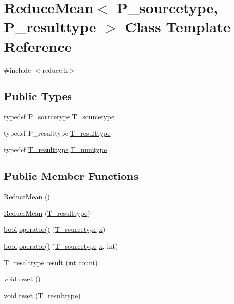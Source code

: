\hypertarget{classReduceMean}{}\section{Reduce\+Mean$<$ P\+\_\+sourcetype, P\+\_\+resulttype $>$ Class Template Reference}
\label{classReduceMean}


{\ttfamily \#include $<$reduce.\+h$>$}

\subsection*{Public Types}
\begin{DoxyCompactItemize}
\item 
typedef P\+\_\+sourcetype \hyperlink{classReduceMean_a5764ca6260fcf90c35a516b7a5ec0fde}{T\+\_\+sourcetype}
\item 
typedef P\+\_\+resulttype \hyperlink{classReduceMean_a6ba4ff1f0f7d4ddf9d2b2a1ed93d7812}{T\+\_\+resulttype}
\item 
typedef \hyperlink{classReduceMean_a6ba4ff1f0f7d4ddf9d2b2a1ed93d7812}{T\+\_\+resulttype} \hyperlink{classReduceMean_afe8ae2f9c567033aceb0824e8ee735e6}{T\+\_\+numtype}
\end{DoxyCompactItemize}
\subsection*{Public Member Functions}
\begin{DoxyCompactItemize}
\item 
\hyperlink{classReduceMean_a25faac9d0a8ae09621d6bac6831dfa5d}{Reduce\+Mean} ()
\item 
\hyperlink{classReduceMean_ab999b2a86df0e82c9f70e5f6f1fe728f}{Reduce\+Mean} (\hyperlink{classReduceMean_a6ba4ff1f0f7d4ddf9d2b2a1ed93d7812}{T\+\_\+resulttype})
\item 
\hyperlink{compiler_8h_abb452686968e48b67397da5f97445f5b}{bool} \hyperlink{classReduceMean_a276031d3298848a584784207b3f9dcb4}{operator()} (\hyperlink{classReduceMean_a5764ca6260fcf90c35a516b7a5ec0fde}{T\+\_\+sourcetype} \hyperlink{vecnorm1_8cc_ac73eed9e41ec09d58f112f06c2d6cb63}{x})
\item 
\hyperlink{compiler_8h_abb452686968e48b67397da5f97445f5b}{bool} \hyperlink{classReduceMean_acbd921f69c393b945a0c40236e16b720}{operator()} (\hyperlink{classReduceMean_a5764ca6260fcf90c35a516b7a5ec0fde}{T\+\_\+sourcetype} \hyperlink{vecnorm1_8cc_ac73eed9e41ec09d58f112f06c2d6cb63}{x}, int)
\item 
\hyperlink{classReduceMean_a6ba4ff1f0f7d4ddf9d2b2a1ed93d7812}{T\+\_\+resulttype} \hyperlink{classReduceMean_ad81e4aeb84b3ffb486f0ae2d181c3bd6}{result} (int \hyperlink{veccount_8cc_ae61b582e808f50a28a8baebd2395ee7d}{count})
\item 
void \hyperlink{classReduceMean_a3ee213d83a0fc8bfda3237cba599c2c0}{reset} ()
\item 
void \hyperlink{classReduceMean_a75ddb7b5b3225ce0710e652cec01e068}{reset} (\hyperlink{classReduceMean_a6ba4ff1f0f7d4ddf9d2b2a1ed93d7812}{T\+\_\+resulttype})
\end{DoxyCompactItemize}
